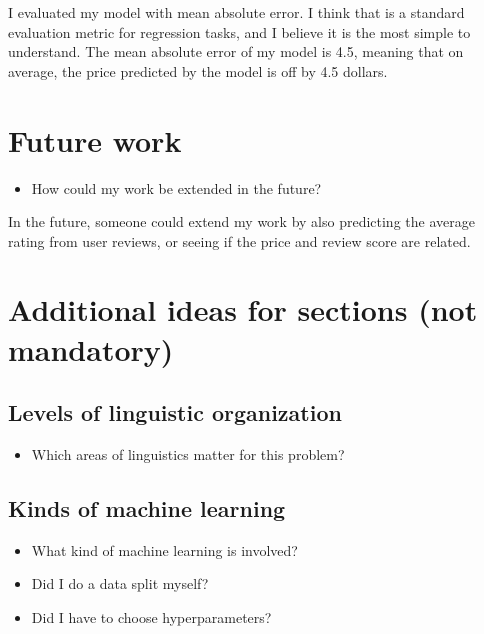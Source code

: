 \documentclass[11pt]{article}
\begin{document}
\begin{tcolorbox}[colback=green!5!white,colframe=green!75!black,title=Example]
  I evaluated my model with mean absolute error.
  I think that is a standard evaluation metric for regression tasks, and I believe it is the most simple to understand.
  The mean absolute error of my model is 4.5, meaning that on average, the price predicted by the model is off by 4.5 dollars.
\end{tcolorbox}

\section{Future work}

\begin{itemize}
    \item How could my work be extended in the future?
\end{itemize}

\begin{tcolorbox}[colback=green!5!white,colframe=green!75!black,title=Example]
  In the future, someone could extend my work by also predicting the average rating from user reviews, or seeing if the price and review score are related.
\end{tcolorbox}

\clearpage

\section{Additional ideas for sections (not mandatory)}

\subsection{Levels of linguistic organization}

\begin{itemize}
    \item Which areas of linguistics matter for this problem?
\end{itemize}

\subsection{Kinds of machine learning}

\begin{itemize}
    \item What kind of machine learning is involved?
    \item Did I do a data split myself?
    \item Did I have to choose hyperparameters?
\end{itemize}
\end{document}
